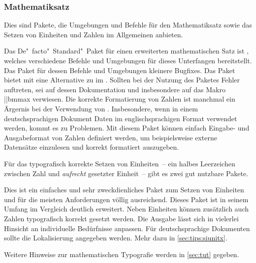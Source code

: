 \subsubsection{Mathematiksatz}
%
Dies sind Pakete, die Umgebungen und Befehle für den Mathematiksatz sowie das 
Setzen von Einheiten und Zahlen im Allgemeinen anbieten.

\begin{DeclarePackages}
  Das De"~facto"~Standard"~Paket für einen erweiterten mathematischen Satz ist 
  , welches verschiedene Befehle und Umgebungen für dieses 
  Unterfangen bereitstellt. Das Paket  für dessen Befehle 
  und Umgebungen kleinere Bugfixes.
  Das Paket bietet mit  eine Alternative zu  im 
  . Sollten bei
  der Nutzung des Paketes Fehler auftreten, sei auf dessen Dokumentation und 
  insbesondere auf das Makro \Macro||{bmmax} verwiesen.
  Die korrekte Formatierung von Zahlen ist manchmal ein Ärgernis bei der  
  Verwendung von . Insbesondere, wenn in einem deutschsprachigen 
  Dokument Daten im englischsprachigen Format verwendet werden, kommt es zu 
  Problemen. Mit diesem Paket können einfach Eingabe- und Ausgabeformat von 
  Zahlen definiert werden, um beispielsweise externe Datensätze einzulesen und 
  korrekt formatiert auszugeben.
\end{DeclarePackages}
%
Für das typografisch korrekte Setzen von Einheiten~-- ein halbes Leerzeichen 
zwischen Zahl und \emph{aufrecht} gesetzter Einheit~-- gibt es zwei gut 
nutzbare Pakete.
%
\begin{DeclarePackages}
%
  Dies ist ein einfaches und sehr zweckdienliches Paket zum Setzen von 
  Einheiten und für die meisten Anforderungen völlig ausreichend.
  Dieses Paket ist in seinem Umfang im Vergleich deutlich erweitert. Neben 
  Einheiten können zusätzlich auch Zahlen typografisch korrekt gesetzt werden. 
  Die Ausgabe lässt sich in vielerlei Hinsicht an individuelle Bedürfnisse 
  anpassen. Für deutschsprachige Dokumenten sollte die Lokalisierung angegeben 
  werden. Mehr dazu in \autoref{sec:tips:siunitx}.
%
\end{DeclarePackages}
%
Weitere Hinweise zur mathematischen Typografie werden in \autoref{sec:tut} 
gegeben.%
%



